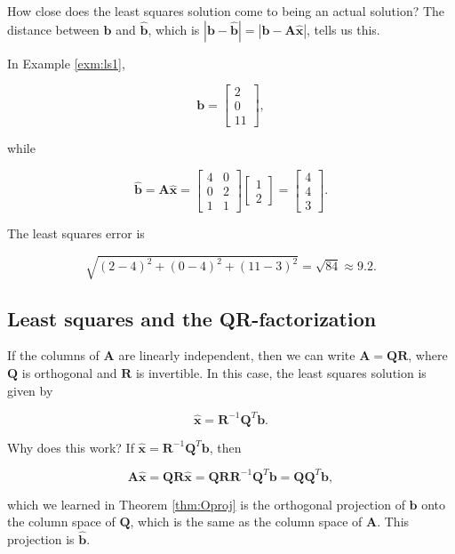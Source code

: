 \documentclass[
]{book}
\theoremstyle{definition}
\theoremstyle{definition}
\theoremstyle{definition}
\theoremstyle{definition}
\theoremstyle{remark}
\begin{document}
How close does the least squares solution come to being an actual solution? The distance between \(\mathbf{b}\) and \(\hat{\mathbf{b}}\), which is \(|\mathbf{b}-\hat{\mathbf{b}}|=|\mathbf{b}-\mathbf{A}\hat{\mathbf{x}}|\), tells us this.

In Example \ref{exm:ls1},

\[\mathbf{b}=\begin{bmatrix}2\\0\\11\end{bmatrix},\]

while

\[\hat{\mathbf{b}}=\mathbf{A}\hat{\mathbf{x}}=\begin{bmatrix}4&0\\0 & 2\\1 & 1\end{bmatrix}\begin{bmatrix}1\\2\end{bmatrix}=\begin{bmatrix}4\\4\\3\end{bmatrix}.\]

The least squares error is

\[\sqrt{(2-4)^2+(0-4)^2+(11-3)^2}=\sqrt{84}\approx 9.2.\]

\subsection*{Least squares and the QR-factorization}\label{least-squares-and-the-qr-factorization}

If the columns of \(\mathbf{A}\) are linearly independent, then we can write \(\mathbf{A}=\mathbf{Q}\mathbf{R}\), where \(\mathbf{Q}\) is orthogonal and \(\mathbf{R}\) is invertible. In this case, the least squares solution is given by

\[\hat{\mathbf{x}}=\mathbf{R}^{-1}\mathbf{Q}^T\mathbf{b}.\]

Why does this work? If \(\hat{\mathbf{x}}=\mathbf{R}^{-1}\mathbf{Q}^T\mathbf{b}\), then

\[\mathbf{A}\hat{\mathbf{x}}=\mathbf{Q}\mathbf{R}\hat{\mathbf{x}}=\mathbf{Q}\mathbf{R}\mathbf{R}^{-1}\mathbf{Q}^T\mathbf{b}=\mathbf{Q}\mathbf{Q}^T\mathbf{b},\]

which we learned in Theorem \ref{thm:Oproj} is the orthogonal projection of \(\mathbf{b}\) onto the column space of \(\mathbf{Q}\), which is the same as the column space of \(\mathbf{A}\). This projection is \(\hat{\mathbf{b}}\).
\end{document}
